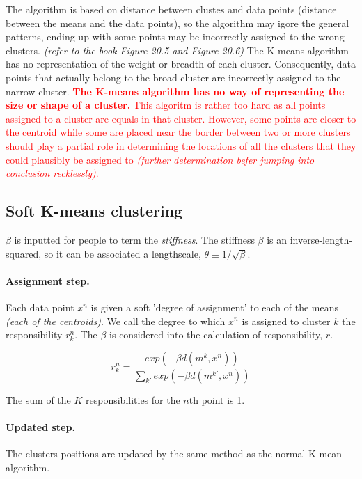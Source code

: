 \documentclass[11pt]{article}
\begin{document}
The algorithm is based on distance between clustes and data points (distance between the means and the data points), so the algorithm may igore the general patterns, ending up with some points may be incorrectly assigned to the wrong clusters. \textit{(refer to the book Figure 20.5 and Figure 20.6)} The K-means algorithm has no representation of the weight or breadth of each cluster. Consequently, data points that actually belong to the broad cluster are incorrectly assigned to the narrow cluster. \textcolor{red}{\textbf{The K-means algorithm has no way of representing the size or shape of a cluster.} This algoritm is rather too hard as all points assigned to a cluster are equals in that cluster. However, some points are closer to the centroid while some are placed near the border between two or more clusters should play a partial role in determining the locations of all the clusters that they could plausibly be assigned to \textit{(further determination befer jumping into conclusion recklessly)}.}

\subsection{Soft K-means clustering}
$\beta$ is inputted for people to term the \textit{stiffness}. The stiffness $\beta$ is an inverse-length-squared, so it can be associated a lengthscale, $\theta \equiv 1 / \sqrt{\beta}$.

\paragraph{Assignment step.}
  Each data point $x^n$ is given a soft 'degree of assignment' to each of the means \textit{(each of the centroids)}. We call the degree to which $x^n$ is assigned to cluster $k$ the responsibility $r^n_k$. The $\beta$ is considered into the calculation of responsibility, $r$.

\begin{equation}
  r_k^n = \frac{exp(-\beta d (m^k, x^n))}{\sum_{k'}exp(-\beta d(m^{k'},x^n))}
\end{equation}

The sum of the $K$ responsibilities for the $n$th point is 1.

\paragraph{Updated step.}
  The clusters \textquotesingle positions are updated by the same method as the normal K-mean algorithm.
\end{document}
